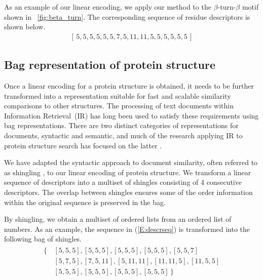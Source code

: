 \documentclass[a4,center,fleqn]{NAR}
\begin{document}
As an example of our linear encoding, we apply our method to the $\beta$-turn-$\beta$ motif shown in \figurename~\ref{fig:beta_turn}.
The corresponding sequence of residue descriptors is shown below.
\begin{gather}\label{E:descrseq} 
    [\, 5, 5, 5, 5, 5, 5, 7, 5, 11, 11, 5, 5, 5, 5, 5, 5 \,]
\end{gather}

\subsection{Bag representation of protein structure}

Once a linear encoding for a protein structure is obtained, it needs to be further transformed into a representation suitable for fast and scalable similarity comparisons to other structures.
The processing of text documents within Information Retrieval~(IR) has long been used to satisfy these requirements using bag representations.
There are two distinct categories of representations for documents, syntactic and semantic, and much of the research applying IR to protein structure search has focused on the latter \cite{Aungand2004,Zhang2010,Budowski2010}. 

We have adapted the syntactic approach to document similarity, often referred to as shingling \cite{Broder1997a}, to our linear encoding of protein structure. 
We transform a linear sequence of descriptors into a multiset of shingles consisting of 4 consecutive descriptors.
The overlap between shingles ensures some of the order information within the original sequence is preserved in the bag. 

By shingling, we obtain a multiset of ordered lists from an ordered list of numbers. 
As an example, the sequence in (\ref{E:descrseq}) is transformed into the following bag of shingles. 
\begin{align}\label{E:shinglebag}
    \begin{split}
        \{\,&[5, 5, 5], [5, 5, 5], [5, 5, 5], [5, 5, 5], [5, 5, 7] \\
            & [5, 7, 5], [7, 5, 11], [5, 11, 11], [11, 11, 5], [11, 5, 5] \\
            & [5, 5, 5], [5, 5, 5], [5, 5, 5], [5, 5, 5] \,\}
    \end{split}
\end{align}
\end{document}
